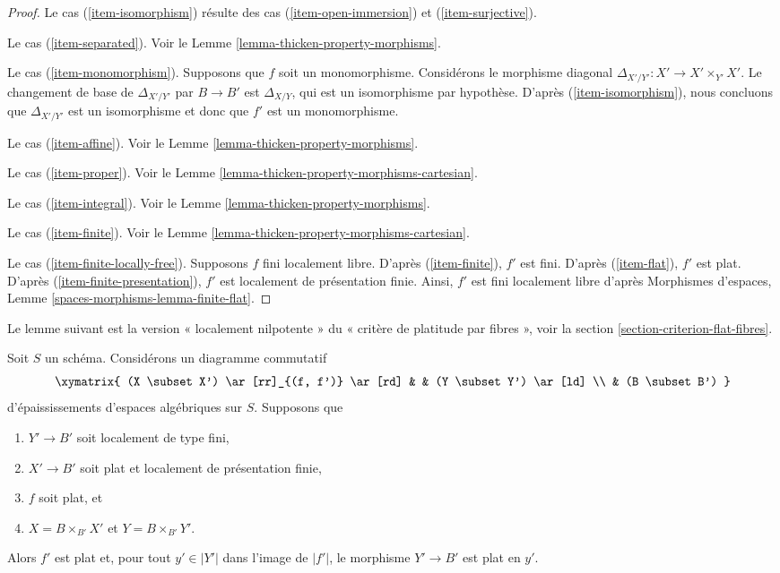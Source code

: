 \begin{proof}
\medskip\noindent
Le cas (\ref{item-isomorphism}) résulte des cas
(\ref{item-open-immersion}) et (\ref{item-surjective}).

\medskip\noindent
Le cas (\ref{item-separated}). Voir le
Lemme \ref{lemma-thicken-property-morphisms}.

\medskip\noindent
Le cas (\ref{item-monomorphism}). Supposons que $f$ soit un monomorphisme.
Considérons le morphisme diagonal $\Delta_{X'/Y'} : X' \to X' \times_{Y'} X'$.
Le changement de base de $\Delta_{X'/Y'}$ par $B \to B'$ est $\Delta_{X/Y}$,
qui est un isomorphisme par hypothèse. D'après (\ref{item-isomorphism}),
nous concluons que $\Delta_{X'/Y'}$ est un isomorphisme et donc que
$f'$ est un monomorphisme.

\medskip\noindent
Le cas (\ref{item-affine}). Voir le Lemme \ref{lemma-thicken-property-morphisms}.

\medskip\noindent
Le cas (\ref{item-proper}). Voir le
Lemme \ref{lemma-thicken-property-morphisms-cartesian}.

\medskip\noindent
Le cas (\ref{item-integral}). Voir le
Lemme \ref{lemma-thicken-property-morphisms}.

\medskip\noindent
Le cas (\ref{item-finite}). Voir le
Lemme \ref{lemma-thicken-property-morphisms-cartesian}.

\medskip\noindent
Le cas (\ref{item-finite-locally-free}). Supposons $f$ fini localement libre.
D'après (\ref{item-finite}), $f'$ est fini.
D'après (\ref{item-flat}), $f'$ est plat.
D'après (\ref{item-finite-presentation}), $f'$ est localement de
présentation finie. Ainsi, $f'$ est fini localement libre d'après
Morphismes d'espaces, Lemme \ref{spaces-morphisms-lemma-finite-flat}.
\end{proof}

\noindent
Le lemme suivant est la version « localement nilpotente » du
« critère de platitude par fibres », voir la
section \ref{section-criterion-flat-fibres}.

\begin{lemma}
\label{lemma-flatness-morphism-thickenings-fp-over-ft}
Soit $S$ un schéma. Considérons un diagramme commutatif
$$
\xymatrix{
(X \subset X') \ar[rr]_{(f, f')} \ar[rd] & & (Y \subset Y') \ar[ld] \\
& (B \subset B')
}
$$
d'épaississements d'espaces algébriques sur $S$. Supposons que
\begin{enumerate}
\item $Y' \to B'$ soit localement de type fini,
\item $X' \to B'$ soit plat et localement de présentation finie,
\item $f$ soit plat, et
\item $X = B \times_{B'} X'$ et $Y = B \times_{B'} Y'$.
\end{enumerate}
Alors $f'$ est plat et, pour tout $y' \in |Y'|$ dans l'image de $|f'|$,
le morphisme $Y' \to B'$ est plat en $y'$.
\end{lemma}

